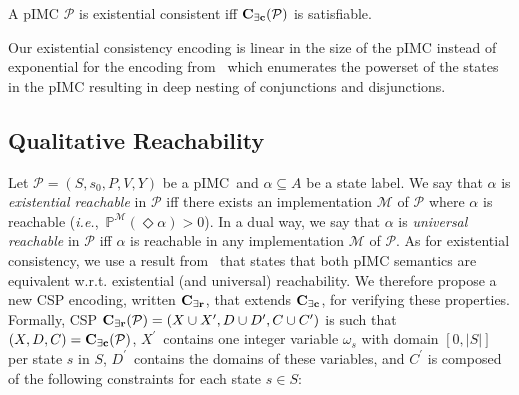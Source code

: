 \documentclass{llncs}
\newcommand{\pimc}{\textnormal{pIMC}}
\newcommand{\csp}{\textnormal{CSP}}
\newcommand{\Mec} {\ensuremath{{\bf C_{{\exists}c}}}}
\newcommand{\Mer}{\ensuremath{{\bf C_{{\exists}r}}}}
\newcommand{\ie} {{\em i.e.},\ }
\newcommand{\Proba}            {\ensuremath{\mathbb{P}}}
\newcommand{\ltlExists}{\ensuremath{\Diamond}}
\begin{document}
\begin{proposition}\label{prop:csp_existential_consistency}
	A {\pimc} $\mathcal{P}$ is existential consistent
    iff $\Mec(\mathcal{P})$ is satisfiable.
\end{proposition}

Our existential consistency encoding is linear in the size of the {\pimc} instead of exponential for the encoding from~\cite{DelahayeLP16} which enumerates the powerset of the states in the {\pimc}
resulting in deep nesting of conjunctions and disjunctions. 

\subsection{Qualitative Reachability}

Let $\mathcal{P} = (S,s_0,P,V,Y)$ be a \pimc\ and 
$\alpha \subseteq A$ be a state label.
We say that $\alpha$ is {\em existential reachable} in $\mathcal{P}$ 
iff there exists an implementation $\mathcal{M}$ of $\mathcal{P}$
where $\alpha$ is reachable
(\ie $\Proba^{\mathcal{M}}(\ltlExists \alpha)>0$).
In a dual way, 
we say that $\alpha$ is {\em universal reachable} in $\mathcal{P}$ 
iff $\alpha$ is reachable in any implementation $\mathcal{M}$ of $\mathcal{P}$.
As for existential consistency, we use a result from~\cite{Delahaye15}
that states that both {\pimc} semantics are equivalent w.r.t.
existential (and universal) reachability. We therefore
propose a new CSP encoding, written $\Mer$, that extends $\Mec$, for verifying these properties. Formally, 
{\csp} $\Mer(\mathcal{P}) = (X \cup X^\prime,D \cup D^\prime,C \cup C^\prime)$ is such that
$(X,D,C) = \Mec(\mathcal{P})$, 
$X^\prime$~contains one integer variable $\omega_s$  with domain $[0, |S|]$ per state $s$ in $S$,
$D^\prime$~contains the domains of these variables, and 
$C^\prime$ is composed of the following constraints for each state $s \in S$:
\smallskip
\end{document}
